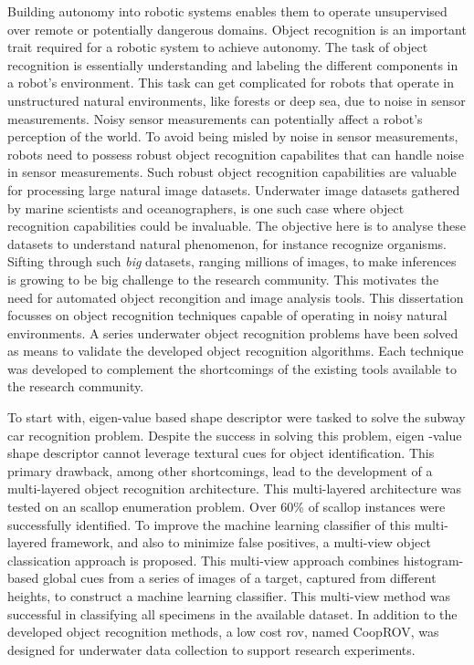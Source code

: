Building autonomy into robotic systems enables them to operate 
unsupervised over remote or potentially dangerous domains.
Object recognition is an important trait required for a robotic system to achieve autonomy.
The task of object recognition is essentially understanding and labeling the different components in a robot's environment. This task can get complicated for robots that operate in unstructured natural environments, like forests or deep sea, due to noise in sensor measurements. Noisy sensor measurements can potentially affect a robot's perception of the world. To avoid being misled by noise in sensor measurements, robots need to possess robust object recognition capabilites that can handle noise in sensor measurements. Such robust object recognition capabilities are valuable for processing large natural image datasets. Underwater image datasets gathered by marine scientists and oceanographers, is one such case where object recognition capabilities could be invaluable. The objective here is to analyse these datasets to understand natural phenomenon, for instance recognize organisms. Sifting through such \emph{big} datasets, ranging millions of images, to make inferences is growing to be big challenge to the 
research community. This motivates the need for automated object recongition and image analysis tools.
This dissertation focusses on object recognition techniques capable of operating in noisy natural environments.
A series underwater object recognition  problems have been solved as means to validate the developed object recognition algorithms. 
Each technique was developed to complement the shortcomings of the existing tools available to the research community. 

To start with, eigen-value based shape descriptor were tasked to solve the subway car recognition problem. Despite the success in solving this problem, eigen -value shape descriptor cannot leverage textural cues for object identification. This primary drawback, among other shortcomings, lead to the development of a multi-layered object recognition architecture. This multi-layered architecture was tested on an scallop enumeration problem. Over 60\% of scallop instances were successfully identified. To improve the machine learning classifier of this multi-layered framework, and also to minimize false positives, a multi-view object classication approach is proposed. This multi-view approach combines histogram-based global cues from a series of images of a target, captured from different heights, to construct a machine learning classifier. This multi-view method was successful in classifying all specimens in the available dataset. In addition to the developed object recognition methods, a low cost \gls{rov}, 
named CoopROV, was designed for underwater data collection to support research experiments.

